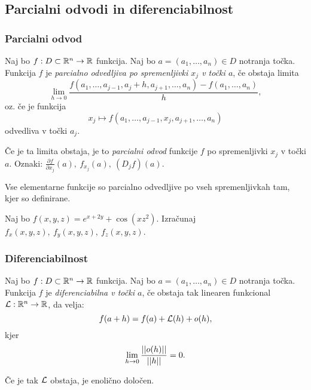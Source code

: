 \newpage
\subsection{Parcialni odvodi in diferenciabilnost}
\subsubsection{Parcialni odvod}
\begin{definicija}
    Naj bo $f: D \subset \mathbb{R}^n \to \mathbb{R}$ funkcija. Naj bo $a = (a_1, \ldots, a_n) \in D$ notranja točka. Funkcija $f$ je \emph{parcialno odvedljiva po spremenljivki $x_j$ v točki $a$}, če obstaja limita 
    $$\lim_{h \to 0} \frac{f(a_1, \ldots, a_{j-1}, a_j+h, a_{j+1}, \ldots, a_n) - f(a_1, \ldots, a_n)}{h},$$
    oz. če je funkcija 
    $$x_j \mapsto f(a_1, \ldots, a_{j-1}, x_j, a_{j+1}, \ldots, a_n)$$
    odvedliva v točki $a_j$.

    Če je ta limita obstaja, je to \emph{parcialni odvod} funkcije $f$ po spremenljivki $x_j$ v točki $a$.
    Oznaki: $\frac{\partial f}{\partial x_j}(a), \ f_{x_j}(a), \ (D_jf)(a)$.
\end{definicija}

\begin{opomba}
    Vse elementarne funkcije so parcialno odvedljive po vseh spremenljivkah tam, kjer so definirane.
\end{opomba}

\begin{zgled}
    Naj bo $f(x, y, z) = e^{x+2y} + \cos(xz^2)$. Izračunaj $f_x(x,y,z), \ f_y(x,y,z), \ f_z(x,y,z)$.
\end{zgled}

\subsubsection{Diferenciabilnost}
\begin{definicija}
    Naj bo $f: D \subset \mathbb{R}^n \to \mathbb{R}$ funkcija. Naj bo $a = (a_1, \ldots, a_n) \in D$ notranja točka. Funkcija $f$ je \emph{diferenciabilna v točki $a$}, če obstaja tak linearen funkcional $\mathcal{L}: \mathbb{R}^n \to \mathbb{R}$, da velja:
    $$f(a+h) = f(a) + \mathcal{L}(h) + o(h),$$
    kjer $$\lim_{h \to 0} \frac{||o(h)||}{||h||} = 0.$$
\end{definicija}

\begin{opomba}
    Če je tak $\mathcal{L}$ obstaja, je enolično določen.
\end{opomba}

